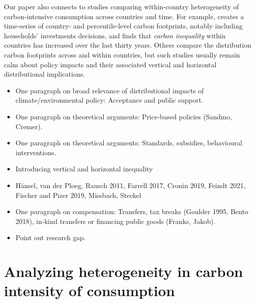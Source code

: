 \documentclass[12pt, a4paper]{article}
\begin{document}


Our paper also connects to studies comparing within-country heterogeneity of carbon-intensive consumption across countries and time. For example, \textcite{Chancel.2022} creates a time-series of country- and percentile-level carbon footprints, notably including households' investments decisions, and finds that \textit{carbon inequality} within countries has increased over the last thirty years. Others \autocite{Oswald.2023,Bruckner.2022} compare the distribution carbon footprints across and within countries, but such studies usually remain calm about policy impacts and their associated vertical and horizontal distributional implications.


\begin{itemize}
    \item One paragraph on broad relevance of distributional impacts of climate/environmental policy: Acceptance and public support.
    \item One paragraph on theoretical arguments: Price-based policies (Sandmo, Cremer).
    \item One paragraph on theoretical arguments: Standards, subsidies, behavioural interventions.
    \item Introducing vertical and horizontal inequality
  \item Hänsel, van der Ploeg, Rausch 2011, Farrell 2017, Cronin 2019, Feindt 2021, Fischer and Pizer 2019, Missbach, Steckel
  \item One paragraph on compensation: Transfers, tax breaks (Goulder 1995, Bento 2018), in-kind transfers or financing public goods (Franks, Jakob).
  \item Point out research gap.

\end{itemize}

\section{Analyzing heterogeneity in carbon intensity of consumption} \label{sec:methods}
\end{document}

